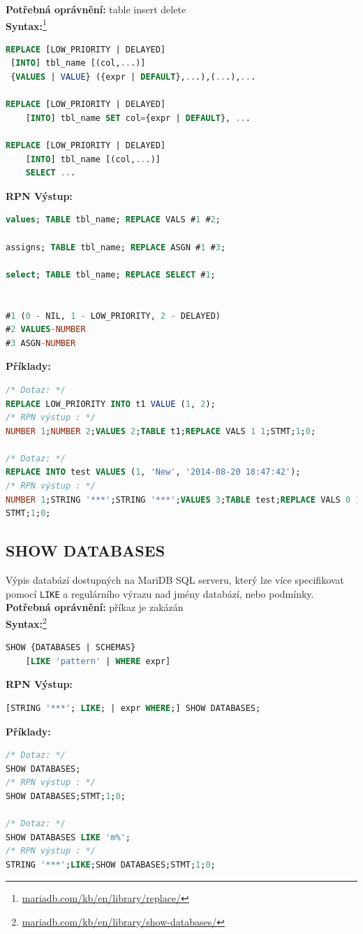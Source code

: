 \textbf{Potřebná oprávnění:} table insert delete \\

\textbf{Syntax:}\footnote{\url{mariadb.com/kb/en/library/replace/}}
\begin{lstlisting}[language=sql]
REPLACE [LOW_PRIORITY | DELAYED]
 [INTO] tbl_name [(col,...)]
 {VALUES | VALUE} ({expr | DEFAULT},...),(...),...

REPLACE [LOW_PRIORITY | DELAYED]
    [INTO] tbl_name SET col={expr | DEFAULT}, ...

REPLACE [LOW_PRIORITY | DELAYED]
    [INTO] tbl_name [(col,...)]
    SELECT ...
\end{lstlisting}
\vspace*{\baselineskip}
\textbf{RPN Výstup:}
\begin{lstlisting}[language=sql]
values; TABLE tbl_name; REPLACE VALS #1 #2;

assigns; TABLE tbl_name; REPLACE ASGN #1 #3;

select; TABLE tbl_name; REPLACE SELECT #1;


#1 (0 - NIL, 1 - LOW_PRIORITY, 2 - DELAYED)
#2 VALUES-NUMBER
#3 ASGN-NUMBER
\end{lstlisting}
\vspace*{\baselineskip}
\textbf{Příklady:}
\begin{lstlisting}[language=sql]
/* Dotaz: */
REPLACE LOW_PRIORITY INTO t1 VALUE (1, 2);
/* RPN výstup : */
NUMBER 1;NUMBER 2;VALUES 2;TABLE t1;REPLACE VALS 1 1;STMT;1;0;

/* Dotaz: */
REPLACE INTO test VALUES (1, 'New', '2014-08-20 18:47:42');
/* RPN výstup : */
NUMBER 1;STRING '***';STRING '***';VALUES 3;TABLE test;REPLACE VALS 0 1;
STMT;1;0;
\end{lstlisting}

\subsection{SHOW DATABASES} \label{subsec:6:showdb}
Výpis databází dostupných na MariDB SQL serveru, který lze více specifikovat pomocí \texttt{LIKE} a regulárního výrazu
nad jmény databází, nebo podmínky. \\

\textbf{Potřebná oprávnění:} příkaz je zakázán \\

\textbf{Syntax:}\footnote{\url{mariadb.com/kb/en/library/show-databases/}}
\begin{lstlisting}[language=sql]
SHOW {DATABASES | SCHEMAS}
    [LIKE 'pattern' | WHERE expr]
\end{lstlisting}
\vspace*{\baselineskip}
\textbf{RPN Výstup:}
\begin{lstlisting}[language=sql]
[STRING '***'; LIKE; | expr WHERE;] SHOW DATABASES;
\end{lstlisting}
\newpage
\textbf{Příklady:}
\begin{lstlisting}[language=sql]
/* Dotaz: */
SHOW DATABASES;
/* RPN výstup : */
SHOW DATABASES;STMT;1;0;

/* Dotaz: */
SHOW DATABASES LIKE 'm%';
/* RPN výstup : */
STRING '***';LIKE;SHOW DATABASES;STMT;1;0;
\end{lstlisting}

